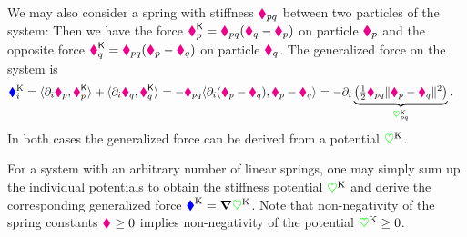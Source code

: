 We may also consider a spring with stiffness $\particleStiffness{\PidxI\PidxII}$ between two particles of the system:
Then we have the force $\particleForceStiff{\PidxI} = \particleStiffness{\PidxI\PidxII} (\particlePos{\PidxII} - \particlePos{\PidxI})$ on particle $\particlePos{\PidxI}$ and the opposite force $\particleForceStiff{\PidxII} = \particleStiffness{\PidxI\PidxII} (\particlePos{\PidxI} - \particlePos{\PidxII})$ on particle $\particlePos{\PidxII}$.
The generalized force on the system is
\begin{align}
 \genForceStiffCoeff{\LidxI} &= \sProd{\dirDiff{\LidxI} \particlePos{\PidxI}}{\particleForceStiff{\PidxI}} + \sProd{\dirDiff{\LidxI} \particlePos{\PidxII}}{\particleForceStiff{\PidxII}} 
 = -\particleStiffness{\PidxI\PidxII} \sProd{\dirDiff{\LidxI} (\particlePos{\PidxI} - \particlePos{\PidxII})}{\particlePos{\PidxI} - \particlePos{\PidxII}}
 = -\dirDiff{\LidxI} \underbrace{\big( \tfrac{1}{2} \particleStiffness{\PidxI\PidxII} \norm{\particlePos{\PidxI} - \particlePos{\PidxII}}^2 \big)}_{\potentialStiff_{\PidxI\PidxII}}.
\end{align}
In both cases the generalized force can be derived from a potential $\potentialStiff$.

For a system with an arbitrary number of linear springs, one may simply sum up the individual potentials to obtain the stiffness potential $\potentialStiff$ and derive the corresponding generalized force $\genForceStiff = \differential \potentialStiff$. 
Note that non-negativity of the spring constants $\particleStiffness{} \geq 0$ implies non-negativity of the potential $\potentialStiff \geq 0$.



